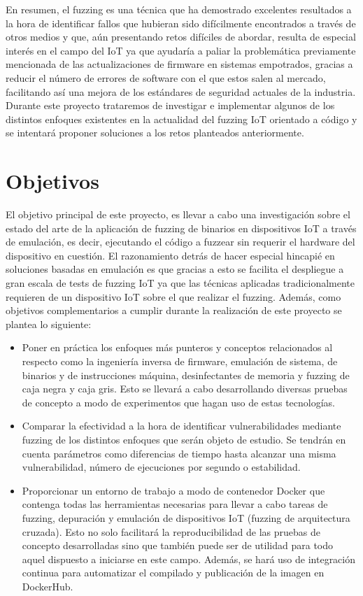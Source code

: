 En resumen, el fuzzing es una técnica que ha demostrado excelentes resultados a la hora de identificar fallos 
que hubieran sido difícilmente encontrados a través de otros medios y que, aún presentando retos difíciles de abordar, resulta de especial interés en
el campo del IoT ya que ayudaría a paliar la problemática previamente mencionada de las actualizaciones de firmware en sistemas empotrados, gracias a reducir el número de errores de software con el que 
estos salen al mercado, facilitando así una mejora de los estándares de seguridad actuales de la industria. Durante este proyecto trataremos de investigar
e implementar algunos de los distintos enfoques existentes en la actualidad del fuzzing IoT orientado a código y se intentará proponer 
soluciones a los retos planteados anteriormente.

\section{Objetivos}
El objetivo principal de este proyecto, es llevar a cabo una investigación sobre el estado del arte de la aplicación de fuzzing de binarios en dispositivos IoT
a través de emulación, es decir, ejecutando el código a fuzzear sin requerir el hardware del dispositivo en cuestión. El razonamiento detrás de hacer especial 
hincapié en soluciones basadas en emulación es que gracias a esto se facilita el despliegue a gran escala de tests de fuzzing IoT ya que las técnicas aplicadas 
tradicionalmente requieren de un dispositivo IoT sobre el que realizar el fuzzing.
Además, como objetivos complementarios a cumplir durante la realización de este proyecto se plantea lo siguiente:
\begin{itemize}
    \item Poner en práctica los enfoques más punteros y 
    conceptos relacionados al respecto como la ingeniería inversa de firmware, emulación de sistema, de binarios y de instrucciones máquina, 
    desinfectantes de memoria y fuzzing de caja negra y caja gris. Esto se llevará a cabo desarrollando diversas pruebas de concepto a modo de 
    experimentos que hagan uso de estas tecnologías.
    \item Comparar la efectividad a la hora de identificar vulnerabilidades mediante fuzzing de los distintos enfoques que serán objeto de estudio. 
    Se tendrán en cuenta parámetros como diferencias de tiempo hasta alcanzar una misma vulnerabilidad, número de ejecuciones por segundo o estabilidad.
    \item Proporcionar un entorno de trabajo a modo de contenedor Docker que contenga todas las herramientas necesarias para llevar a cabo tareas de 
    fuzzing, depuración y emulación de dispositivos IoT (fuzzing de arquitectura cruzada). Esto no solo facilitará la reproducibilidad de las pruebas de 
    concepto desarrolladas sino que también puede ser de utilidad para todo aquel dispuesto a iniciarse en este campo. Además, se hará uso de 
    integración continua para automatizar el compilado y publicación de la imagen en DockerHub.
\end{itemize}

